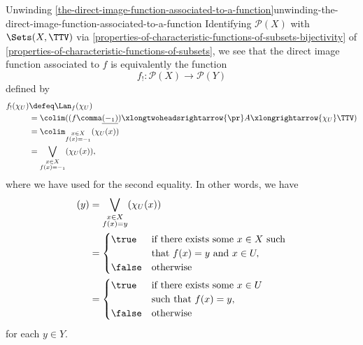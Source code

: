 \begin{remark}{Unwinding \cref{the-direct-image-function-associated-to-a-function}}{unwinding-the-direct-image-function-associated-to-a-function}%
    Identifying $\mathcal{P}(X)$ with $\Sets(X,\TTV)$ via \cref{properties-of-characteristic-functions-of-subsets-bijectivity} of \cref{properties-of-characteristic-functions-of-subsets}, we see that the direct image function associated to $f$ is equivalently the function
    \[
        f_{!}%
        \colon%
        \mathcal{P}(X)%
        \to%
        \mathcal{P}(Y)%
    \]%
    defined by
    \begin{align*}
        f_{!}(\chi_{U}) &\defeq \Lan_{f}(\chi_{U})\\%
                        &=      \colim((f\comma\underline{(-_{1})})\xlongtwoheadsrightarrow{\pr}A\xlongrightarrow{\chi_{U}}\TTV)\\%
                        &=      \colim_{\substack{x\in X\\f(x)=-_{1}}}(\chi_{U}(x))\\%
                        &=      \bigvee_{\substack{x\in X\\f(x)=-_{1}}}(\chi_{U}(x)),%
    \end{align*}
    where we have used  for the second equality. In other words, we have
    \begin{align*}
        [f_{!}(\chi_{U})](y)%
        &=%
        \bigvee_{\substack{x\in X\\f(x)=y}}(\chi_{U}(x))\\%
        &=%
        \begin{cases}
            \true  &\text{if there exists some $x\in X$ such}\\
                   &\text{that $f(x)=y$ and $x\in U,$}\\
            \false &\text{otherwise}
        \end{cases}\\
        &=%
        \begin{cases}
            \true  &\text{if there exists some $x\in U$}\\
                   &\text{such that $f(x)=y$,}\\
            \false &\text{otherwise}
        \end{cases}
    \end{align*}
    for each $y\in Y$.
\end{remark}

